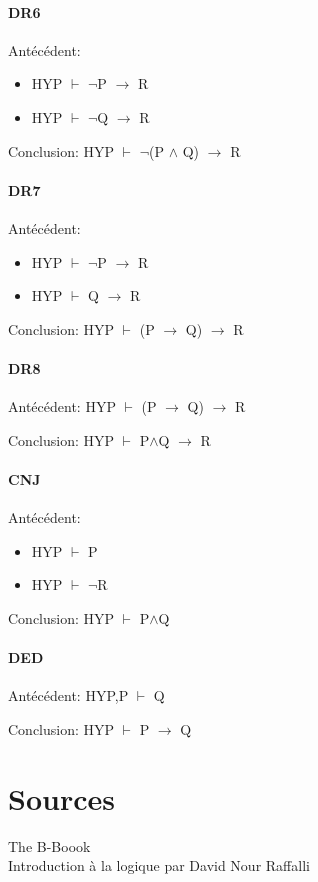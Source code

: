 \documentclass[a4paper,12pt]{article}
\begin{document}
\paragraph{DR6}

Antécédent: \begin{itemize}
             \item HYP $\vdash$ $\neg$P  $\rightarrow$ R
             \item HYP $\vdash$ $\neg$Q $\rightarrow$ R
            \end{itemize}

Conclusion: HYP $\vdash$  $\neg$(P $\wedge$ Q) $\rightarrow$ R

\paragraph{DR7}
 
Antécédent: \begin{itemize}
             \item HYP $\vdash$ $\neg$P  $\rightarrow$ R
             \item HYP $\vdash$ Q $\rightarrow$ R
            \end{itemize}
            
Conclusion: HYP $\vdash$  (P $\rightarrow$ Q) $\rightarrow$ R

\paragraph{DR8}
Antécédent: HYP $\vdash$  (P $\rightarrow$ Q) $\rightarrow$ R

Conclusion: HYP $\vdash$  P$\wedge$Q  $\rightarrow$ R

\paragraph{CNJ}
Antécédent: \begin{itemize}
             \item HYP $\vdash$ P
             \item HYP $\vdash$ $\neg$R
            \end{itemize}
            
Conclusion: HYP $\vdash$ P$\wedge$Q       

\paragraph{DED}
Antécédent: HYP,P $\vdash$ Q

Conclusion: HYP $\vdash$ P $\rightarrow$ Q
      


\section{Sources}
The B-Boook\\
Introduction à la logique par David Nour Raffalli
\end{document}
